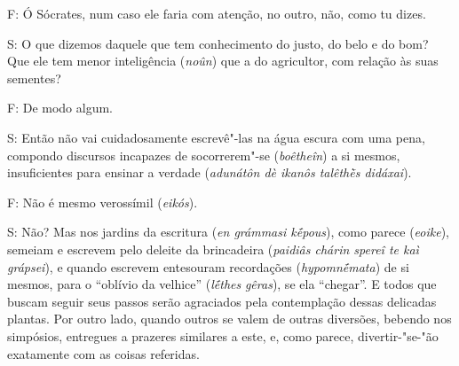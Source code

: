  

\bekker{[276c]} F: Ó Sócrates, num caso ele faria com atenção, no outro, não,
como tu dizes.

 

S: O que dizemos daquele que tem conhecimento do justo, do belo e do
bom? Que ele tem menor inteligência (\emph{noûn}) que a do agricultor,
com relação às suas sementes?

F: De modo algum.

 

S: Então não vai cuidadosamente escrevê"-las na água escura com uma pena,
compondo discursos incapazes de socorrerem"-se (\emph{boêtheîn}) a si
mesmos, insuficientes para ensinar a verdade (\emph{adunátôn dè ikanôs
talêthḕs didáxai}).

F: Não é mesmo verossímil (\emph{eikós}).

 

\bekker{[276d]} S: Não? Mas nos jardins da escritura (\emph{en grámmasi
kḗpous}), como parece (\emph{eoike}), semeiam e escrevem pelo deleite da
brincadeira (\emph{paidiâs chárin spereî te kaì grápsei}), e quando
escrevem entesouram recordações (\emph{hypomnḗmata}) de si mesmos, para
o ``oblívio da velhice'' (\emph{lḗthes} \emph{gêras}), se ela
``chegar''. E todos que buscam seguir seus passos serão agraciados pela contemplação dessas
delicadas plantas. Por outro lado, quando outros se valem de outras
diversões, bebendo nos simpósios, entregues a prazeres similares a este,
e, como parece, divertir-"se-"ão exatamente com as coisas referidas.

 

